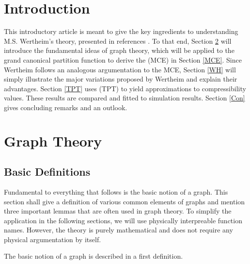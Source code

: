 \documentclass[8.5pt,twoside,twocolumn]{article}
\theoremstyle{standard}
\begin{document}
\section{Introduction}

This introductory article is meant to give the key ingredients to understanding M.S. Wertheim's theory, presented in
references \cite{Wertheim1}\cite{Wertheim2}\cite{Wertheim3}\cite{Wertheim4}\cite{WertheimTPT}. To that end, Section \ref{GrT}
will introduce the fundamental ideas of graph theory, which will be applied to the grand canonical partition function
to derive the  (MCE) in Section \ref{MCE}. Since Wertheim follows an analogous argumentation to the
MCE, Section \ref{WH} will simply illustrate the major variations proposed by Wertheim and explain their advantages. Section
\ref{TPT} uses  (TPT) to yield approximations to compressibility values. These results are
compared and fitted to simulation results. Section \ref{Con} gives concluding remarks and an outlook.


\section{Graph Theory}
\label{GrT}
\subsection{Basic Definitions}
Fundamental to everything that follows is the basic notion of a graph. This
section shall give a definition of various common elements of graphs and
mention three important lemmas that are often used in graph theory. To simplify
the application in the following sections, we will use physically interpreable
function names. However, the theory is purely mathematical and does not require
any physical argumentation by itself.

The basic notion of a graph is described in a first definition.
\end{document}
